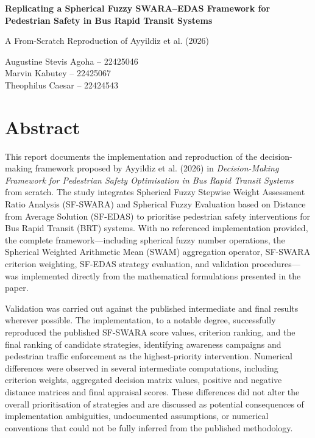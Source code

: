 \documentclass[11pt]{article}
\begin{document}
\begin{center}
    {\LARGE\bfseries Replicating a Spherical Fuzzy SWARA--EDAS Framework for Pedestrian Safety in Bus Rapid Transit Systems}

    \vspace{0.5em}

    {\large A From-Scratch Reproduction of Ayyildiz et al. (2026)}

    \vspace{1em}

    Augustine Stevis Agoha -- 22425046\\
    Marvin Kabutey -- 22425067\\
    Theophilus Caesar -- 22424543
\end{center}

\vspace{1em}
\section*{Abstract}
This report documents the implementation and reproduction of the decision-making framework proposed by Ayyildiz et al. (2026) in \emph{Decision-Making Framework for Pedestrian Safety Optimisation in Bus Rapid Transit Systems} from scratch. The study integrates Spherical Fuzzy Stepwise Weight Assessment Ratio Analysis (SF-SWARA) and Spherical Fuzzy Evaluation based on Distance from Average Solution (SF-EDAS) to prioritise pedestrian safety interventions for Bus Rapid Transit (BRT) systems. With no referenced implementation provided, the complete framework---including spherical fuzzy number operations, the Spherical Weighted Arithmetic Mean (SWAM) aggregation operator, SF-SWARA criterion weighting, SF-EDAS strategy evaluation, and validation procedures---was implemented directly from the mathematical formulations presented in the paper.

Validation was carried out against the published intermediate and final results wherever possible. The implementation, to a notable degree, successfully reproduced the published SF-SWARA score values, criterion ranking, and the final ranking of candidate strategies, identifying awareness campaigns and pedestrian traffic enforcement as the highest-priority intervention. Numerical differences were observed in several intermediate computations, including criterion weights, aggregated decision matrix values, positive and negative distance matrices and final appraisal scores. These differences did not alter the overall prioritisation of strategies and are discussed as potential consequences of implementation ambiguities, undocumented assumptions, or numerical conventions that could not be fully inferred from the published methodology.
\end{document}
